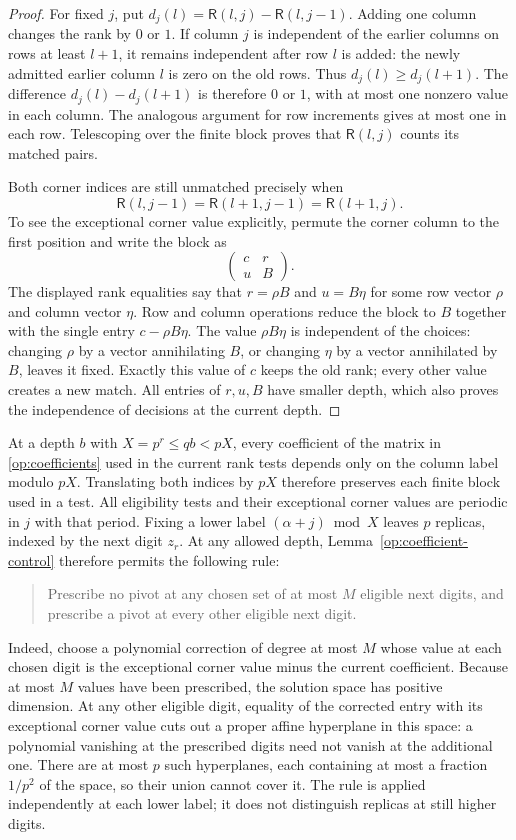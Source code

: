 \begin{proof}
For fixed $j$, put
$d_j(l)=\mathsf R(l,j)-\mathsf R(l,j-1)$. Adding one column changes
the rank by $0$ or $1$. If column $j$ is independent of the earlier
columns on rows at least $l+1$, it remains independent after row
$l$ is added: the newly admitted earlier column $l$ is zero on the
old rows. Thus $d_j(l)\ge d_j(l+1)$. The difference
$d_j(l)-d_j(l+1)$ is therefore $0$ or $1$, with at most one
nonzero value in each column. The analogous argument for row
increments gives at most one in each row. Telescoping over the
finite block proves that $\mathsf R(l,j)$ counts its matched pairs.

Both corner indices are still unmatched precisely when
\[
 \mathsf R(l,j-1)=\mathsf R(l+1,j-1)=\mathsf R(l+1,j).
\]
To see the exceptional corner value explicitly, permute the corner
column to the first position and write the block as
\[
 \begin{pmatrix}c&r\\ u&B\end{pmatrix}.
\]
The displayed rank equalities say that $r=\rho B$ and $u=B\eta$
for some row vector $\rho$ and column vector $\eta$. Row and column
operations reduce the block to $B$ together with the single entry
$c-\rho B\eta$. The value $\rho B\eta$ is independent of the choices:
changing $\rho$ by a vector annihilating $B$, or changing $\eta$ by
a vector annihilated by $B$, leaves it fixed. Exactly this value of
$c$ keeps the old rank; every other value creates a new match.
All entries of $r,u,B$ have smaller depth, which also proves the
independence of decisions at the current depth.
\end{proof}

At a depth $b$ with $X=p^r\le qb<pX$, every coefficient of the
matrix in \eqref{op:coefficients} used in the current rank tests
depends only on the column label modulo $pX$. Translating both
indices by $pX$ therefore preserves each finite block used in a
test. All eligibility tests and their exceptional corner values
are periodic in $j$ with that period. Fixing a lower label
$(\alpha+j)\bmod X$ leaves $p$ replicas, indexed by the next digit
$z_r$. At any allowed depth, Lemma~\ref{op:coefficient-control}
therefore permits the following rule:
\begin{quote}
Prescribe no pivot at any chosen set of at most $M$ eligible next
digits, and prescribe a pivot at every other eligible next digit.
\end{quote}
Indeed, choose a polynomial correction of degree at most $M$ whose
value at each chosen digit is the exceptional corner value minus
the current coefficient. Because at most $M$ values have been
prescribed, the solution space has positive dimension. At any other
eligible digit, equality of the corrected entry with its exceptional
corner value cuts out a proper affine hyperplane in this space: a
polynomial vanishing at the prescribed digits need not vanish at the
additional one. There are
at most $p$ such hyperplanes, each containing at most a fraction
$1/p^2$ of the space, so their union cannot cover it. The rule is
applied independently at each lower label; it does not distinguish
replicas at still higher digits.

